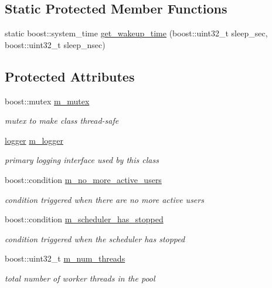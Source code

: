 \subsection*{Static Protected Member Functions}
\begin{DoxyCompactItemize}
\item 
static boost\-::system\-\_\-time \hyperlink{classpion_1_1scheduler_ad4ca39f249281cb2c6bd354cc52d0b9e}{get\-\_\-wakeup\-\_\-time} (boost\-::uint32\-\_\-t sleep\-\_\-sec, boost\-::uint32\-\_\-t sleep\-\_\-nsec)
\end{DoxyCompactItemize}
\subsection*{Protected Attributes}
\begin{DoxyCompactItemize}
\item 
boost\-::mutex \hyperlink{classpion_1_1scheduler_a0a1cf13bf9b31229c6d6f030ddbb0d09}{m\-\_\-mutex}
\begin{DoxyCompactList}\small\item\em mutex to make class thread-\/safe \end{DoxyCompactList}\item 
\hyperlink{structpion_1_1logger}{logger} \hyperlink{classpion_1_1scheduler_aa611e2e63bc69eefce43c243846d99e5}{m\-\_\-logger}
\begin{DoxyCompactList}\small\item\em primary logging interface used by this class \end{DoxyCompactList}\item 
boost\-::condition \hyperlink{classpion_1_1scheduler_a35fe165b525a1babfa8dd2a602d0e598}{m\-\_\-no\-\_\-more\-\_\-active\-\_\-users}
\begin{DoxyCompactList}\small\item\em condition triggered when there are no more active users \end{DoxyCompactList}\item 
boost\-::condition \hyperlink{classpion_1_1scheduler_ab5321fccd4a1136f4358cce8679d22fd}{m\-\_\-scheduler\-\_\-has\-\_\-stopped}
\begin{DoxyCompactList}\small\item\em condition triggered when the scheduler has stopped \end{DoxyCompactList}\item 
boost\-::uint32\-\_\-t \hyperlink{classpion_1_1scheduler_a0ecf6f549714b0e9e33fea80a11a073f}{m\-\_\-num\-\_\-threads}
\begin{DoxyCompactList}\small\item\em total number of worker threads in the pool \end{DoxyCompactList}\item 

\end{DoxyCompactItemize}
